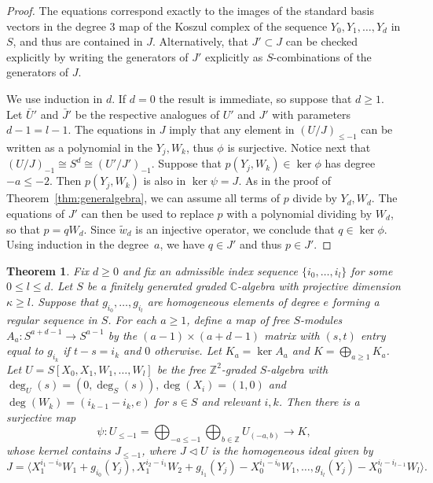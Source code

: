 \documentclass[a4paper,11pt]{amsart}
\theoremstyle{plain}
\newtheorem{theorem}{Theorem}[section]
\theoremstyle{definition}
\newcommand{\C}{\mathbb{C}}
\newcommand{\Z}{\mathbb{Z}}
\begin{document}
\begin{proof}
    The equations correspond exactly to the images of the standard basis vectors in the degree $3$ map of the Koszul complex of the sequence $Y_0,Y_1,\dots,Y_d$ in $S$, and thus are contained in $J$. Alternatively, that $J' \subset J$ can be checked explicitly by writing the generators of $J'$ explicitly as $S$-combinations of the generators of $J$.
    
    We use induction in $d$. If $d = 0$ the result is immediate, so suppose that $d \geq 1$. Let $\bar U'$ and $\bar J'$ be the respective analogues of $U'$ and $J'$ with parameters $d-1 = l-1$. The equations in $J$ imply that any element in $(U/J)_{\leq -1}$ can be written as a polynomial in the $Y_j, W_k$, thus $\phi$ is surjective. Notice next that $(U/J)_{-1} \cong S^d \cong (U'/J')_{-1}$. Suppose that $p(Y_j,W_k) \in \ker \phi$ has degree $-a \leq -2$. Then $p(Y_j,W_k)$ is also in $\ker \psi = J$. As in the proof of Theorem~\ref{thm:generalgebra}, we can assume all terms of $p$ divide by $Y_d, W_d$. The equations of $J'$ can then be used to replace $p$ with a polynomial dividing by $W_d$, so that $p = qW_d$. Since $\tilde w_d$ is an injective operator, we conclude that $q \in \ker \phi$. Using induction in the degree~$a$, we have $q\in J'$ and thus $p \in J'$.
\end{proof}

\begin{theorem} \label{regularsequencekernels}
    Fix $d \geq 0$ and fix an admissible index sequence $\{i_0,\ldots, i_l\}$ for some $0 \leq l \leq d$. Let $S$ be a finitely generated graded $\C$-algebra with projective dimension $\kappa \geq l$. Suppose that $g_{i_0},\dots,g_{i_l}$ are homogeneous elements of degree $e$ forming a regular sequence in $S$. For each $a \geq 1$, define a map of free $S$-modules $A_a : S^{a+d-1} \rightarrow S^{a-1}$ by the $(a-1) \times (a+d-1)$ matrix with $(s,t)$ entry equal to $g_{i_k}$ if $t-s = i_k$ and $0$ otherwise. Let $K_a = \ker A_a$ and $K = \bigoplus_{a\geq 1} K_a$. Let $U = S[X_0,X_1,W_1,\dots,W_l]$ be the free $\Z^2$-graded $S$-algebra with $\deg_U(s) = (0,\deg_S(s)), \deg(X_i) = (1,0)$ and $\deg(W_k) = (i_{k-1}-i_k,e)$ for $s \in S$ and relevant $i,k$.     Then there is a surjective map
    \[
    \psi : U_{\leq -1} = \bigoplus_{-a \leq -1} \bigoplus_{b\in \Z} U_{(-a,b)} \rightarrow K,
    \]
whose kernel contains $J_{\leq -1}$, where $J \lhd U$ is the homogeneous ideal given by
    \[
       J = \langle X_1^{i_1 - i_0} W_1 + g_{i_0}(Y_j), X_1^{i_2 - i_1} W_2 + g_{i_1}(Y_j) - X_0^{i_1 - i_0} W_1,  \dots , g_{i_l}(Y_j) - X_0^{i_l - i_{l-1}} W_l\rangle.
    \]
\end{theorem}
\end{document}
